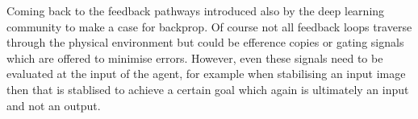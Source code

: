 \documentclass{llncs}
\begin{document}
Coming back to the feedback pathways introduced also by the deep
learning community to make a case for backprop. Of course not all
feedback loops traverse through the physical environment but could be
efference copies \cite{Uexkuell26,Graesser86} or gating signals which are offered
to minimise errors. However, even these signals need to be evaluated
at the input of the agent, for example when stabilising an input image
then that is stablised to achieve a certain goal which again is ultimately
an input and not an output.








\end{document}

